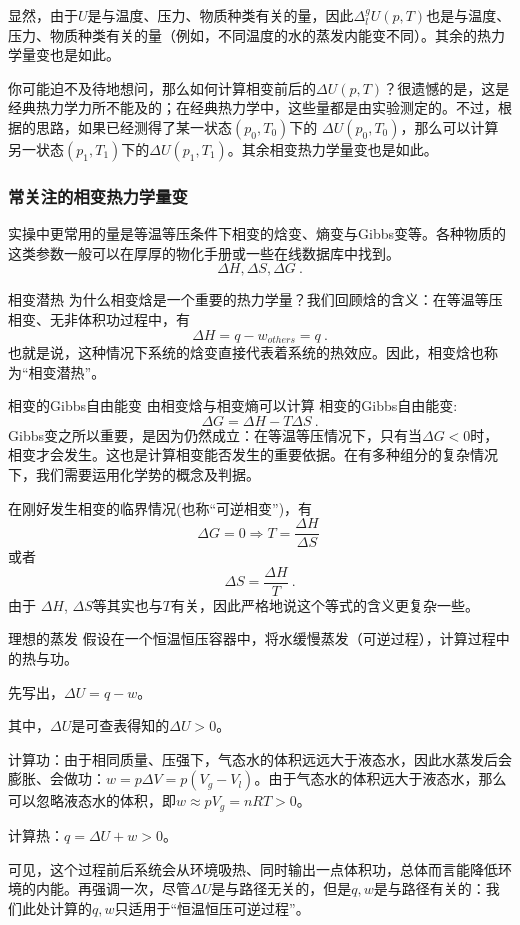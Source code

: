 显然，由于$U$是与温度、压力、物质种类有关的量，因此$\Delta ^ g_l U (p,T)$也是与温度、压力、物质种类有关的量（例如，不同温度的水的蒸发内能变不同）。其余的热力学量变也是如此。

你可能迫不及待地想问，那么如何计算相变前后的$\Delta U (p,T)$？很遗憾的是，这是经典热力学力所不能及的；在经典热力学中，这些量都是由实验测定的。不过，根据的思路，如果已经测得了某一状态$(p_0,T_0)$下的 $\Delta U (p_0,T_0)$，那么可以计算另一状态$(p_1,T_1)$下的$\Delta U (p_1,T_1)$。其余相变热力学量变也是如此。

\subsubsection{常关注的相变热力学量变}
实操中更常用的量是等温等压条件下相变的焓变、熵变与Gibbs变等。各种物质的这类参数一般可以在厚厚的物化手册或一些在线数据库中找到。
$$
\Delta H, \Delta  S, \Delta G~.
$$

\begin{example}{相变潜热}
为什么相变焓是一个重要的热力学量？我们回顾焓的含义：在等温等压相变、无非体积功过程中，有
$$
\Delta H = q - w_{others} = q~.
$$
也就是说，这种情况下系统的焓变直接代表着系统的热效应。因此，相变焓也称为“相变潜热”。
\end{example}

\begin{example}{相变的Gibbs自由能变}
由相变焓与相变熵可以计算 相变的Gibbs自由能变:
$$
\Delta G = \Delta H - T \Delta S~.
$$
Gibbs变之所以重要，是因为仍然成立：在等温等压情况下，只有当$\Delta G<0$时，相变才会发生。这也是计算相变能否发生的重要依据。在有多种组分的复杂情况下，我们需要运用化学势的概念及判据。

在刚好发生相变的临界情况(也称“可逆相变”)，有
$$
\Delta G = 0 \Rightarrow T = \frac{\Delta H}{\Delta S}~
$$
或者
$$
\Delta S = \frac{\Delta H}{T}~.
$$
由于 $\Delta H$, $\Delta S$等其实也与$T$有关，因此严格地说这个等式的含义更复杂一些。
\end{example}

\begin{example}{理想的蒸发}
假设在一个恒温恒压容器中，将水缓慢蒸发（可逆过程），计算过程中的热与功。

先写出，$\Delta U = q - w$。

其中，$\Delta U$是可查表得知的$\Delta U>0$。

计算功：由于相同质量、压强下，气态水的体积远远大于液态水，因此水蒸发后会膨胀、会做功：$w=p\Delta V = p(V_g - V_l)$。由于气态水的体积远大于液态水，那么可以忽略液态水的体积，即$w \approx p V_g = nRT > 0$。

计算热：$q = \Delta U + w > 0$。

可见，这个过程前后系统会从环境吸热、同时输出一点体积功，总体而言能降低环境的内能。再强调一次，尽管$\Delta U$是与路径无关的，但是$q, w$是与路径有关的：我们此处计算的$q, w$只适用于“恒温恒压可逆过程”。
\end{example}

